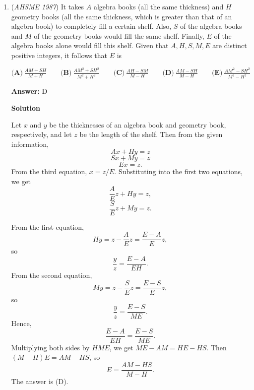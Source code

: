 \begin{enumerate}
 $\textbf{(A)}\ \text{Dick, Ann, Carol, Bill} \qquad \textbf{(B)}\ \text{Dick, Ann, Bill, Carol} \qquad \textbf{(C)}\ \text{Dick, Carol, Bill, Ann}\\ \qquad \textbf{(D)}\ \text{Ann, Dick, Carol, Bill}\qquad \textbf{(E)}\ \text{Ann, Dick, Bill, Carol}$

 \textbf{Answer: }E



\textbf{Solution}

Let the scores be $A$, $B$, $C$, and $D$. Then we have $A + C = B + D$, $A + B > C + D$, and $D > B + C$. Call these equations $(1)$, $(2)$, and $(3)$ respectively. Then adding $(1)$ and $(2)$ gives $2A + B + C > B + C + 2D \implies 2A > 2D \implies A > D$. Now subtracting $(1)$ from $(2)$ gives $A + B - A - C > C + D - B - D \implies B - C > C - B \implies 2B > 2C \implies B > C$. Finally from $(3)$, since  $D > B + C$ and $C$ is non-negative, we must have $D > B$, so putting our results together we get $A > D > B > C$, which is answer $\boxed{\text{E}}$.

 


	\item (\textit{AHSME 1987}) It takes $A$ algebra books (all the same thickness) and $H$ geometry books (all the same thickness, 
which is greater than that of an algebra book) to completely fill a certain shelf. 
Also, $S$ of the algebra books and $M$ of the geometry books would fill the same shelf. 
Finally, $E$ of the algebra books alone would fill this shelf. Given that $A, H, S, M, E$ are distinct positive integers, 
it follows that $E$ is


 $\textbf{(A)}\ \frac{AM+SH}{M+H} \qquad \textbf{(B)}\ \frac{AM^2+SH^2}{M^2+H^2} \qquad \textbf{(C)}\ \frac{AH-SM}{M-H}\qquad \textbf{(D)}\ \frac{AM-SH}{M-H}\qquad \textbf{(E)}\ \frac{AM^2-SH^2}{M^2-H^2}$

 \textbf{Answer: }D



\textbf{Solution}

Let $x$ and $y$ be the thicknesses of an algebra book and geometry book, respectively, and let $z$ be the length of the shelf. Then from the given information,
 \[Ax + Hy = z\]
 \[Sx + My = z\]
 \[Ex = z.\] From the third equation, $x = z/E$. Substituting into the first two equations, we get
 \[\frac{A}{E} z + Hy = z,\] 
 \[\frac{S}{E} z + My = z.\] 

 From the first equation,
 \[Hy = z - \frac{A}{E} z = \frac{E - A}{E} z,\]so
 \[\frac{y}{z} = \frac{E - A}{EH}.\]From the second equation,
 \[My = z - \frac{S}{E} z = \frac{E - S}{E} z,\]so
 \[\frac{y}{z} = \frac{E - S}{ME}.\]Hence,
 \[\frac{E - A}{EH} = \frac{E - S}{ME}.\]Multiplying both sides by $HME$, we get $ME - AM = HE - HS$. Then $(M - H)E = AM - HS$, so
 \[E = \boxed{\frac{AM - HS}{M - H}}.\]The answer is (D).


\end{enumerate}

